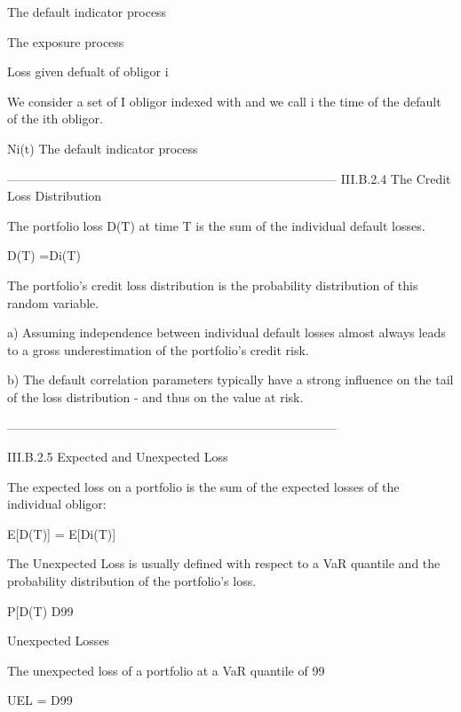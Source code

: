  

The default indicator process

The exposure process

Loss given defualt of obligor i

 

We consider a set of I obligor indexed with  and we call i the time of the default of the ith obligor.

 

Ni(t)   The default indicator process



--------------------------------------------------------------------------------
III.B.2.4 The Credit Loss Distribution

The portfolio loss D(T) at time T is the sum of the individual default losses.

    D(T) =Di(T)

 

The portfolio's credit loss distribution is the probability distribution of this random variable.

 

a) Assuming independence between individual default losses almost always leads to a gross underestimation of the portfolio's credit risk.

b) The default correlation parameters typically have a strong influence on the tail of the loss distribution - and thus on the value at risk.

 

 


--------------------------------------------------------------------------------


 

III.B.2.5 Expected and Unexpected Loss 

The expected loss on a portfolio is the sum of the expected losses of the individual obligor:

E[D(T)] = E[Di(T)]

The Unexpected Loss is usually defined with respect to a VaR quantile and the probability distribution of the portfolio’s loss. 

P[D(T) D99%


Unexpected Losses

The unexpected loss of a portfolio at a VaR quantile of 99%

UEL = D99%


